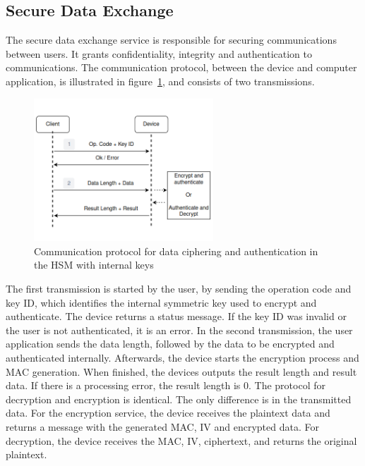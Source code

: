 \subsection{Secure Data Exchange}\label{chap:arch:services:data-exchange}

The secure data exchange service is responsible for securing communications between users. It grants confidentiality, integrity and authentication to communications.
The communication protocol, between the device and computer application, is illustrated in figure~\ref{fig:protocol:data-exchange}, and consists of two transmissions.
\begin{figure}[h!]
	\centering
	\includegraphics[width=0.60\textwidth]{./Images/data-exchange.png}
	\caption{Communication protocol for data ciphering and authentication in the HSM with internal keys}
	\label{fig:protocol:data-exchange}
\end{figure}

The first transmission is started by the user, by sending the operation code and key ID, which identifies the internal symmetric key used to encrypt and authenticate.
The device returns a status message. If the key ID was invalid or the user is not authenticated, it is an error.
In the second transmission, the user application sends the data length, followed by the data to be encrypted and authenticated internally.
Afterwards, the device starts the encryption process and MAC generation. When finished, the devices outputs the result length and result data. If there is a processing error, the result length is 0.
The protocol for decryption and encryption is identical. The only difference is in the transmitted data. For the encryption service, the device receives the plaintext data and returns a message with the generated MAC, IV and encrypted data. For decryption, the device receives the MAC, IV, ciphertext, and returns the original plaintext.

